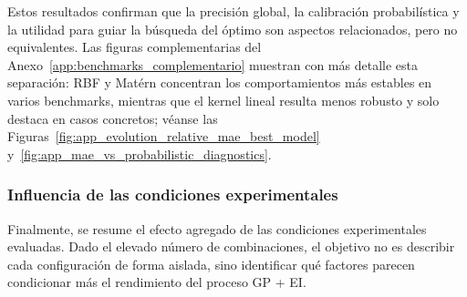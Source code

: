 Estos resultados confirman que la precisión global, la calibración probabilística y la utilidad para guiar la búsqueda del óptimo son aspectos relacionados, pero no equivalentes. Las figuras complementarias del Anexo~\ref{app:benchmarks_complementario} muestran con más detalle esta separación: RBF y Matérn concentran los comportamientos más estables en varios benchmarks, mientras que el kernel lineal resulta menos robusto y solo destaca en casos concretos; véanse las Figuras~\ref{fig:app_evolution_relative_mae_best_model} y~\ref{fig:app_mae_vs_probabilistic_diagnostics}.

\subsubsection{Influencia de las condiciones experimentales}\label{subsubsec:influencia_condiciones_benchmarks}

Finalmente, se resume el efecto agregado de las condiciones experimentales evaluadas. Dado el elevado número de combinaciones, el objetivo no es describir cada configuración de forma aislada, sino identificar qué factores parecen condicionar más el rendimiento del proceso GP + EI.

